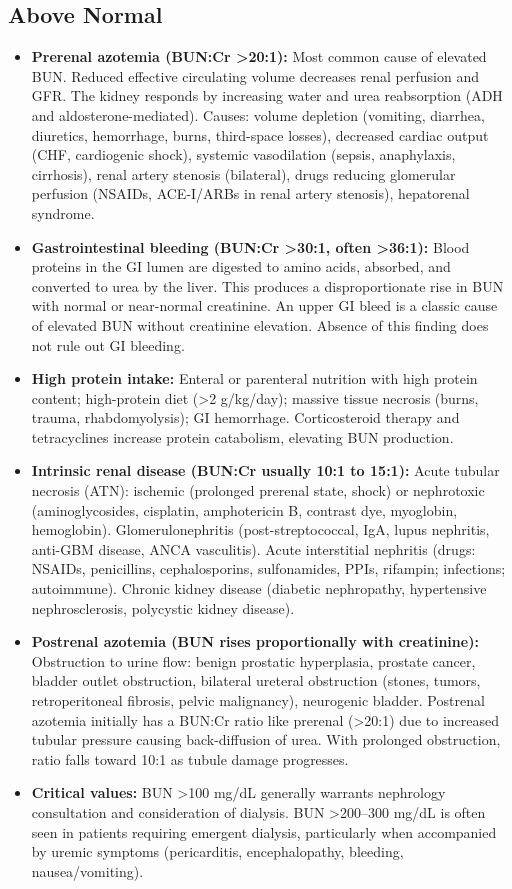 \subsection*{Above Normal}
\begin{itemize}
  \item \textbf{Prerenal azotemia (BUN:Cr >20:1):} Most common cause of elevated BUN. Reduced effective circulating volume decreases renal perfusion and GFR. The kidney responds by increasing water and urea reabsorption (ADH and aldosterone-mediated). Causes: volume depletion (vomiting, diarrhea, diuretics, hemorrhage, burns, third-space losses), decreased cardiac output (CHF, cardiogenic shock), systemic vasodilation (sepsis, anaphylaxis, cirrhosis), renal artery stenosis (bilateral), drugs reducing glomerular perfusion (NSAIDs, ACE-I/ARBs in renal artery stenosis), hepatorenal syndrome.
  \item \textbf{Gastrointestinal bleeding (BUN:Cr >30:1, often >36:1):} Blood proteins in the GI lumen are digested to amino acids, absorbed, and converted to urea by the liver. This produces a disproportionate rise in BUN with normal or near-normal creatinine. An upper GI bleed is a classic cause of elevated BUN without creatinine elevation. Absence of this finding does not rule out GI bleeding.
  \item \textbf{High protein intake:} Enteral or parenteral nutrition with high protein content; high-protein diet (>2 g/kg/day); massive tissue necrosis (burns, trauma, rhabdomyolysis); GI hemorrhage. Corticosteroid therapy and tetracyclines increase protein catabolism, elevating BUN production.
  \item \textbf{Intrinsic renal disease (BUN:Cr usually 10:1 to 15:1):} Acute tubular necrosis (ATN): ischemic (prolonged prerenal state, shock) or nephrotoxic (aminoglycosides, cisplatin, amphotericin B, contrast dye, myoglobin, hemoglobin). Glomerulonephritis (post-streptococcal, IgA, lupus nephritis, anti-GBM disease, ANCA vasculitis). Acute interstitial nephritis (drugs: NSAIDs, penicillins, cephalosporins, sulfonamides, PPIs, rifampin; infections; autoimmune). Chronic kidney disease (diabetic nephropathy, hypertensive nephrosclerosis, polycystic kidney disease).
  \item \textbf{Postrenal azotemia (BUN rises proportionally with creatinine):} Obstruction to urine flow: benign prostatic hyperplasia, prostate cancer, bladder outlet obstruction, bilateral ureteral obstruction (stones, tumors, retroperitoneal fibrosis, pelvic malignancy), neurogenic bladder. Postrenal azotemia initially has a BUN:Cr ratio like prerenal (>20:1) due to increased tubular pressure causing back-diffusion of urea. With prolonged obstruction, ratio falls toward 10:1 as tubule damage progresses.
  \item \textbf{Critical values:} BUN >100 mg/dL generally warrants nephrology consultation and consideration of dialysis. BUN >200--300 mg/dL is often seen in patients requiring emergent dialysis, particularly when accompanied by uremic symptoms (pericarditis, encephalopathy, bleeding, nausea/vomiting).
\end{itemize}

